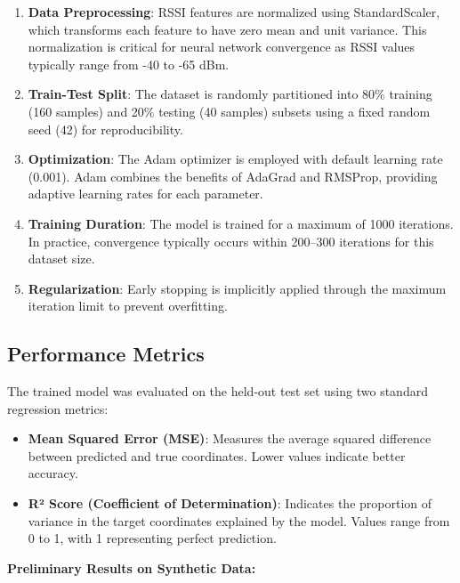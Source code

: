 \begin{enumerate}
    \item \textbf{Data Preprocessing}: RSSI features are normalized using StandardScaler, which transforms each feature to have zero mean and unit variance. This normalization is critical for neural network convergence as RSSI values typically range from -40 to -65 dBm.
    
    \item \textbf{Train-Test Split}: The dataset is randomly partitioned into 80\% training (160 samples) and 20\% testing (40 samples) subsets using a fixed random seed (42) for reproducibility.
    
    \item \textbf{Optimization}: The Adam optimizer is employed with default learning rate (0.001). Adam combines the benefits of AdaGrad and RMSProp, providing adaptive learning rates for each parameter.
    
    \item \textbf{Training Duration}: The model is trained for a maximum of 1000 iterations. In practice, convergence typically occurs within 200--300 iterations for this dataset size.
    
    \item \textbf{Regularization}: Early stopping is implicitly applied through the maximum iteration limit to prevent overfitting.
\end{enumerate}

\subsection{Performance Metrics}

The trained model was evaluated on the held-out test set using two standard regression metrics:

\begin{itemize}
    \item \textbf{Mean Squared Error (MSE)}: Measures the average squared difference between predicted and true coordinates. Lower values indicate better accuracy.
    
    \item \textbf{R² Score (Coefficient of Determination)}: Indicates the proportion of variance in the target coordinates explained by the model. Values range from 0 to 1, with 1 representing perfect prediction.
\end{itemize}

\textbf{Preliminary Results on Synthetic Data:}

